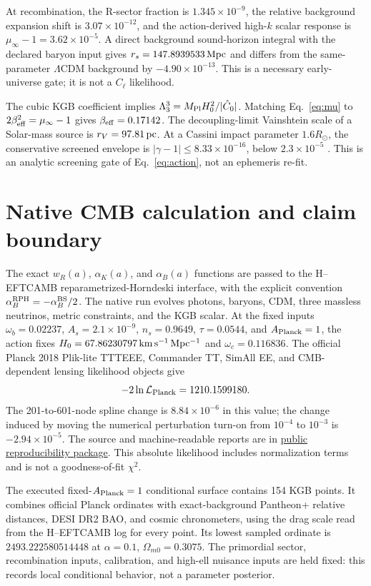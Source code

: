 \documentclass[11pt,a4paper]{article}
\newcommand{\Mpl}{M_{\rm Pl}}
\newcommand{\repo}{\href{https://github.com/MartinPetrasek123/MartinPetrasek123/tree/main/r-universe-global-kgb-completion}{public reproducibility package}}
\begin{document}
At recombination, the R-sector fraction is $1.345\times10^{-9}$, the relative background expansion shift is $3.07\times10^{-12}$, and the action-derived high-$k$ scalar response is $\mu_\infty-1=3.62\times10^{-5}$. A direct background sound-horizon integral with the declared baryon input gives $r_s=147.8939533\,{\rm Mpc}$ and differs from the same-parameter $\Lambda$CDM background by $-4.90\times10^{-13}$. This is a necessary early-universe gate; it is not a $C_\ell$ likelihood.

The cubic KGB coefficient implies $\Lambda_3^3=\Mpl H_0^2/|\hat C_0|$. Matching Eq.~\eqref{eq:mu} to $2\beta_{\rm eff}^2=\mu_\infty-1$ gives $\beta_{\rm eff}=0.17142$. The decoupling-limit Vainshtein scale of a Solar-mass source is $r_V=97.81\,{\rm pc}$. At a Cassini impact parameter $1.6R_\odot$, the conservative screened envelope is $|\gamma-1|\le8.33\times10^{-16}$, below $2.3\times10^{-5}$ \citep{Bertotti2003}. This is an analytic screening gate of Eq.~\eqref{eq:action}, not an ephemeris re-fit.

\section{Native CMB calculation and claim boundary}

The exact $w_R(a)$, $\alpha_K(a)$, and $\alpha_B(a)$ functions are passed to
the H--EFTCAMB reparametrized-Horndeski interface, with the explicit convention
$\alpha_B^{\rm RPH}=-\alpha_B^{\rm BS}/2$. The native run evolves photons,
baryons, CDM, three massless neutrinos, metric constraints, and the KGB scalar.
At the fixed inputs $\omega_b=0.02237$, $A_s=2.1\times10^{-9}$,
$n_s=0.9649$, $\tau=0.0544$, and $A_{\rm Planck}=1$, the action fixes
$H_0=67.86230797\,{\rm km\,s^{-1}\,Mpc^{-1}}$ and $\omega_c=0.116836$.
The official Planck 2018 Plik-lite TTTEEE, Commander TT, SimAll EE, and
CMB-dependent lensing likelihood objects \citep{Planck2018V} give
\begin{equation}
-2\ln\mathcal L_{\rm Planck}=1210.1599180.
\end{equation}
The 201-to-601-node spline change is $8.84\times10^{-6}$ in this value; the
change induced by moving the numerical perturbation turn-on from $10^{-4}$ to
$10^{-3}$ is $-2.94\times10^{-5}$. The source and machine-readable reports
are in \repo. This absolute likelihood includes normalization terms and is not
a goodness-of-fit $\chi^2$.

The executed fixed-$A_{\rm Planck}=1$ conditional surface contains 154 KGB
points. It combines official Planck ordinates with exact-background Pantheon+
relative distances, DESI DR2 BAO, and cosmic chronometers, using the drag scale
read from the H--EFTCAMB log for every point. Its lowest sampled ordinate is
$2493.222580514448$ at $\alpha=0.1$, $\Omega_{m0}=0.3075$. The primordial
sector, recombination inputs, calibration, and high-ell nuisance inputs are
held fixed: this records local conditional behavior, not a parameter posterior.
\end{document}
